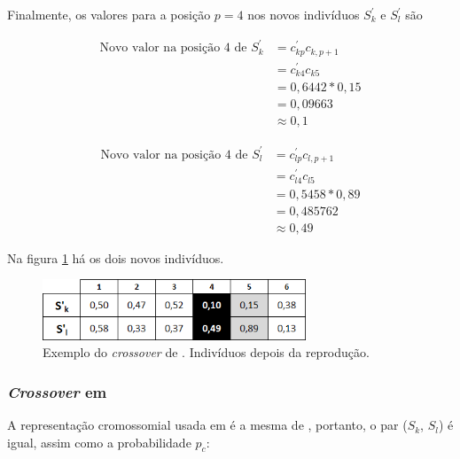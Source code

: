 Finalmente, os valores para a posição $p = 4$ nos novos indivíduos $S^{'}_k$ e $S^{'}_l$ são

\begin{equation}\label{eq:cross2004_novo_valor_sk}
	\begin{array}{ll}
	\mbox{Novo valor na posição 4 de  } S^{'}_k & = c^{'}_{kp} c_{k,p+1} \\
								& = c^{'}_{k4} c_{k5} \\
								& = 0,6442 * 0,15	\\
								& = 0,09663	\\
								& \approx 0,1
	\end{array}
\end{equation}

\begin{equation}\label{eq:cross2004_novo_valor_sl}
	\begin{array}{ll}
	\mbox{Novo valor na posição 4 de  } S^{'}_l & = c^{'}_{lp} c_{l,p+1} \\
								& = c^{'}_{l4} c_{l5} \\
								& = 0,5458 * 0,89	\\
								& = 0,485762 \\
								& \approx  0,49
	\end{array}
\end{equation}


Na figura \ref{fig:cross2004_tabelaDepois} há os dois novos indivíduos.

\begin{figure}[htbp]
	\centering
		\includegraphics[width=0.70\textwidth]{figs/materiais_metodo/autovalores_com_ga/cross2004_tabelaDepois.png}
	\caption{Exemplo do \emph{crossover} de \cite{metodo2004}. Indivíduos depois da reprodução.}
	\label{fig:cross2004_tabelaDepois}
\end{figure}

\subsubsection{\emph{Crossover} em \cite{metodo2011}}	

	A representação cromossomial usada em \cite{metodo2011} é a mesma de \cite{metodo2004}, portanto, o par ($S_k$, $S_l$) é igual, assim como a probabilidade $p_c$:
	
